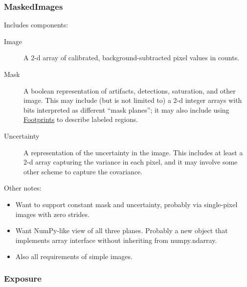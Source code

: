 \subsubsection{MaskedImages}
\label{sec:spImagesMaskedImages}

Includes components:
\begin{description}
\item[Image] A 2-d array of calibrated, background-subtracted pixel values in counts.
\item[Mask] A boolean representation of artifacts, detections, saturation, and other image.  This may include (but is not limited to) a 2-d integer arrays with bits interpreted as different ``mask planes''; it may also include using \hyperref[sec:spFootprints]{Footprints} to describe labeled regions.
\item[Uncertainty] A representation of the uncertainty in the image.  This includes at least a 2-d array capturing the variance in each pixel, and it may involve some other scheme to capture the covariance.
\end{description}

Other notes:
\begin{itemize}
\item Want to support constant mask and uncertainty, probably via single-pixel images with zero strides.
\item Want NumPy-like view of all three planes.  Probably a new object that implements array interface without inheriting from numpy.ndarray.
\item Also all requirements of simple images.
\end{itemize}

\subsubsection{Exposure}
\label{sec:spImagesExposure}

